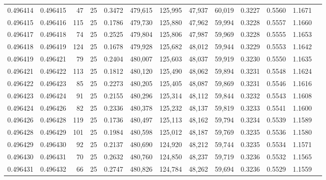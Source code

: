\begin{tabular}{rrrrrrrrrrrrr}
0.496414 & 0.496415 &    47 &  25 &                                     0.3472 & 479,615 & 125,995 &  47,937 &  60,019 & 0.3227 & 0.5560 & 1.1671 \\
0.496415 & 0.496416 &   115 &  25 &                                     0.1786 & 479,730 & 125,880 &  47,962 &  59,994 & 0.3228 & 0.5557 & 1.1660 \\
0.496417 & 0.496418 &    74 &  25 &                                     0.2525 & 479,804 & 125,806 &  47,987 &  59,969 & 0.3228 & 0.5555 & 1.1653 \\
0.496418 & 0.496419 &   124 &  25 &                                     0.1678 & 479,928 & 125,682 &  48,012 &  59,944 & 0.3229 & 0.5553 & 1.1642 \\
0.496419 & 0.496421 &    79 &  25 &                                     0.2404 & 480,007 & 125,603 &  48,037 &  59,919 & 0.3230 & 0.5550 & 1.1635 \\
0.496421 & 0.496422 &   113 &  25 &                                     0.1812 & 480,120 & 125,490 &  48,062 &  59,894 & 0.3231 & 0.5548 & 1.1624 \\
0.496422 & 0.496423 &    85 &  25 &                                     0.2273 & 480,205 & 125,405 &  48,087 &  59,869 & 0.3231 & 0.5546 & 1.1616 \\
0.496423 & 0.496424 &    91 &  25 &                                     0.2155 & 480,296 & 125,314 &  48,112 &  59,844 & 0.3232 & 0.5543 & 1.1608 \\
0.496424 & 0.496426 &    82 &  25 &                                     0.2336 & 480,378 & 125,232 &  48,137 &  59,819 & 0.3233 & 0.5541 & 1.1600 \\
0.496426 & 0.496428 &   119 &  25 &                                     0.1736 & 480,497 & 125,113 &  48,162 &  59,794 & 0.3234 & 0.5539 & 1.1589 \\
0.496428 & 0.496429 &   101 &  25 &                                     0.1984 & 480,598 & 125,012 &  48,187 &  59,769 & 0.3235 & 0.5536 & 1.1580 \\
0.496429 & 0.496430 &    92 &  25 &                                     0.2137 & 480,690 & 124,920 &  48,212 &  59,744 & 0.3235 & 0.5534 & 1.1571 \\
0.496430 & 0.496431 &    70 &  25 &                                     0.2632 & 480,760 & 124,850 &  48,237 &  59,719 & 0.3236 & 0.5532 & 1.1565 \\
0.496431 & 0.496432 &    66 &  25 &                                     0.2747 & 480,826 & 124,784 &  48,262 &  59,694 & 0.3236 & 0.5529 & 1.1559 \\

\end{tabular}
